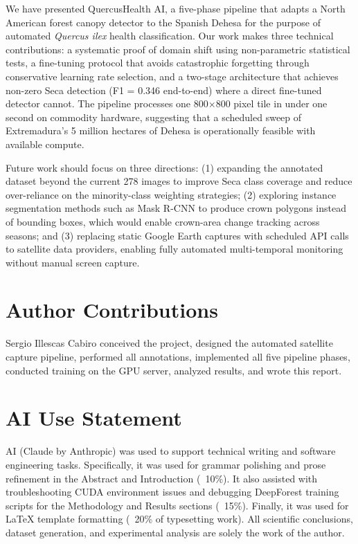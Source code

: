 \documentclass[10pt,twocolumn]{article}
\begin{document}
We have presented QuercusHealth AI, a five-phase pipeline that adapts a
North American forest canopy detector to the Spanish Dehesa for the purpose
of automated \textit{Quercus ilex} health classification. Our work makes
three technical contributions: a systematic proof of domain shift using
non-parametric statistical tests, a fine-tuning protocol that avoids
catastrophic forgetting through conservative learning rate selection, and
a two-stage architecture that achieves non-zero Seca detection (F1 = 0.346
end-to-end) where a direct fine-tuned detector cannot. The pipeline processes
one 800$\times$800 pixel tile in under one second on commodity hardware,
suggesting that a scheduled sweep of Extremadura's 5 million hectares of
Dehesa is operationally feasible with available compute.

Future work should focus on three directions: (1) expanding the annotated
dataset beyond the current 278 images to improve Seca class coverage and
reduce over-reliance on the minority-class weighting strategies; (2) exploring
instance segmentation methods such as Mask R-CNN to produce crown polygons
instead of bounding boxes, which would enable crown-area change tracking
across seasons; and (3) replacing static Google Earth captures with scheduled
API calls to satellite data providers, enabling fully automated multi-temporal
monitoring without manual screen capture.

\section*{Author Contributions}

Sergio Illescas Cabiro conceived the project, designed the automated satellite
capture pipeline, performed all annotations, implemented all five pipeline
phases, conducted training on the GPU server, analyzed results, and wrote
this report.

\section*{AI Use Statement}

AI (Claude by Anthropic) was used to support technical writing and software engineering tasks. Specifically, it was used for grammar polishing and prose refinement in the Abstract and Introduction (~10\%). It also assisted with troubleshooting CUDA environment issues and debugging DeepForest training scripts for the Methodology and Results sections (~15\%). Finally, it was used for LaTeX template formatting (~20\% of typesetting work). All scientific conclusions, dataset generation, and experimental analysis are solely the work of the author.

\FloatBarrier


\end{document}
